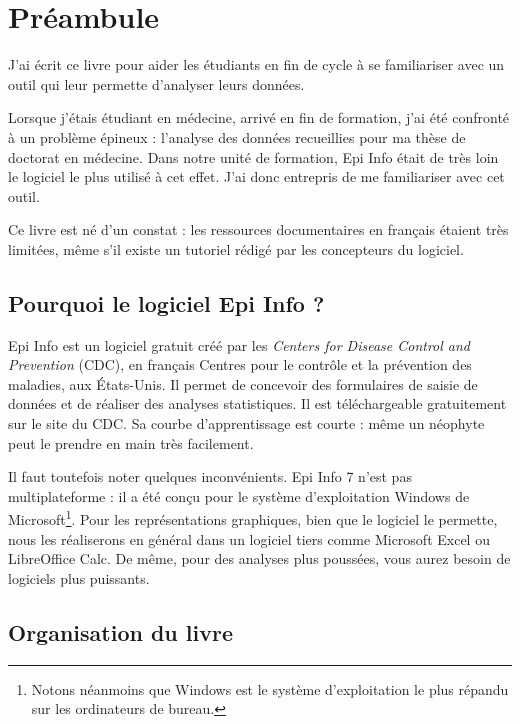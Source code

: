 \chapter*{Préambule}
\label{preambule}

J'ai écrit ce livre pour aider les étudiants en fin de cycle à se familiariser avec un outil qui leur permette d'analyser leurs données.

Lorsque j'étais étudiant en médecine, arrivé en fin de formation, j'ai été confronté à un problème épineux : l'analyse des données recueillies pour ma thèse de doctorat en médecine. Dans notre unité de formation, Epi Info était de très loin le logiciel le plus utilisé à cet effet. J'ai donc entrepris de me familiariser avec cet outil.

Ce livre est né d'un constat : les ressources documentaires en français étaient très limitées, même s'il existe un tutoriel rédigé par les concepteurs du logiciel.

\section*{Pourquoi le logiciel Epi Info ?}

Epi Info est un logiciel gratuit créé par les \emph{Centers for Disease Control and Prevention} (CDC), en français Centres pour le contrôle et la prévention des maladies, aux États-Unis. Il permet de concevoir des formulaires de saisie de données et de réaliser des analyses statistiques. Il est téléchargeable gratuitement sur le site du CDC. Sa courbe d'apprentissage est courte : même un néophyte peut le prendre en main très facilement.

Il faut toutefois noter quelques inconvénients. Epi Info 7 n'est pas multiplateforme : il a été conçu pour le système d'exploitation Windows de Microsoft\footnote{Notons néanmoins que Windows est le système d'exploitation le plus répandu sur les ordinateurs de bureau.}. Pour les représentations graphiques, bien que le logiciel le permette, nous les réaliserons en général dans un logiciel tiers comme Microsoft Excel ou LibreOffice Calc. De même, pour des analyses plus poussées, vous aurez besoin de logiciels plus puissants.

\section*{Organisation du livre}

